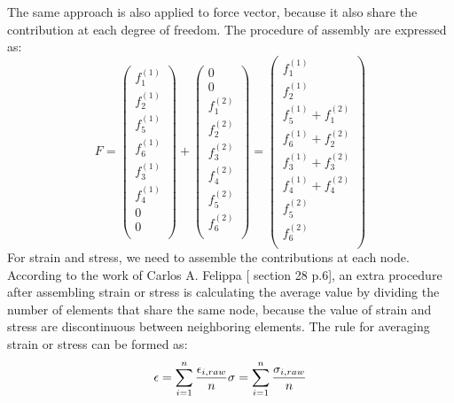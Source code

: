The same approach is also applied to force vector, because it also share the contribution at each degree of freedom. The procedure of assembly are expressed as:
\begin{equation}
F =  \begin{pmatrix}
f_1^{\left(1\right)} \\
f_2^{\left(1\right)} \\
f_5^{\left(1\right)} \\ 
f_6^{\left(1\right)} \\ 
f_3^{\left(1\right)} \\
f_4^{\left(1\right)} \\
0 \\ 
0 \\ 
\end{pmatrix} +  \begin{pmatrix}
0 \\ 
0 \\ 
f_1^{\left(2\right)} \\
f_2^{\left(2\right)} \\
f_3^{\left(2\right)} \\ 
f_4^{\left(2\right)} \\ 
f_5^{\left(2\right)} \\
f_6^{\left(2\right)} \\
\end{pmatrix} = \begin{pmatrix}
f_1^{\left(1\right)} \\
f_2^{\left(1\right)} \\
f_5^{\left(1\right)}+ f_1^{\left(2\right)} \\ 
f_6^{\left(1\right)}+ f_2^{\left(2\right)} \\ 
f_3^{\left(1\right)}+ f_3^{\left(2\right)}\\
f_4^{\left(1\right)}+ f_4^{\left(2\right)} \\
f_5^{\left(2\right)} \\ 
f_6^{\left(2\right)}  \\ 
\end{pmatrix} 
\end{equation}
For strain and stress, we need to assemble the contributions at each node. According to the work of Carlos A. Felippa [\cite{Felippa} section 28 p.6], an extra procedure after assembling strain or stress is calculating the average value by dividing the number of elements that share the same node, because the value of strain and stress are discontinuous between neighboring elements. The rule for averaging strain or stress can be formed as:
\begin{equation}
\epsilon = \displaystyle\sum_{i=1}^{n} \frac{\epsilon_{i,raw}}{n}
\\
\sigma = \displaystyle\sum_{i=1}^{n} \frac{\sigma_{i,raw}}{n}
\end{equation} 



